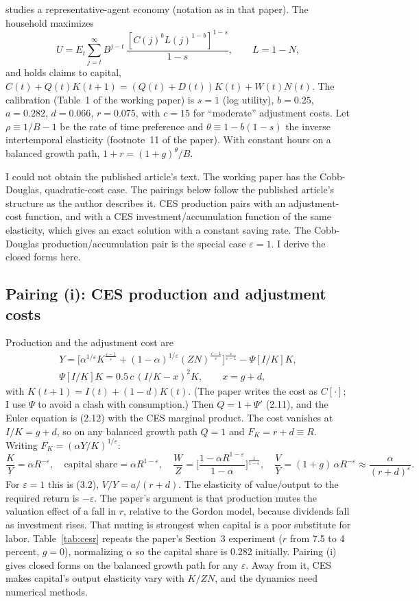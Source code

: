 \documentclass[11pt]{article}
\newcommand{\e}{\varepsilon}
\begin{document}
\citet{kiley2000} studies a representative-agent economy (notation as in that paper).
The household maximizes
\begin{equation*}
U = E_t\sum_{j=t}^{\infty} B^{j-t}\,\frac{[C(j)^b L(j)^{1-b}]^{1-s}}{1-s},
\qquad L = 1-N, \tag{2.1}
\end{equation*}
and holds claims to capital, $C(t)+Q(t)K(t+1)=(Q(t)+D(t))K(t)+W(t)N(t)$. The
calibration (Table~1 of the working paper) is $s=1$ (log utility), $b=0.25$, $a=0.282$,
$d=0.066$, $r=0.075$, with $c=15$ for ``moderate'' adjustment costs. Let $\rho\equiv 1/B-1$
be the rate of time preference and $\theta\equiv 1-b(1-s)$ the inverse intertemporal
elasticity (footnote~11 of the paper). With constant hours on a balanced growth path,
$1+r=(1+g)^\theta/B$.

I could not obtain the published article's text. The working paper has the
Cobb-Douglas, quadratic-cost case. The pairings below follow the published
article's structure as the author describes it. CES production pairs with an
adjustment-cost function, and with a CES investment/accumulation function of the same
elasticity, which gives an exact solution with a constant saving rate. The Cobb-Douglas
production/accumulation pair is the special case $\e=1$. I derive the closed forms here.

\subsection{Pairing (i): CES production and adjustment costs}

Production and the adjustment cost are
\begin{gather*}
Y=\Big[\alpha^{1/\e}K^{\frac{\e-1}{\e}}+(1-\alpha)^{1/\e}(ZN)^{\frac{\e-1}{\e}}\Big]^{\frac{\e}{\e-1}}
-\Psi[I/K]K, \tag{2.7$'$}\\
\Psi[I/K]K=0.5\,c\,(I/K-x)^2K,\qquad x=g+d,
\end{gather*}
with $K(t+1)=I(t)+(1-d)K(t)$. (The paper writes the cost as $C[\cdot]$; I use $\Psi$ to
avoid a clash with consumption.) Then $Q=1+\Psi'$ (2.11), and the Euler equation is
(2.12) with the CES marginal product. The cost vanishes at $I/K=g+d$, so on any balanced
growth path $Q=1$ and $F_K=r+d\equiv R$. Writing $F_K=(\alpha Y/K)^{1/\e}$:
\begin{equation}
\frac KY=\alpha R^{-\e},\quad \text{capital share}=\alpha R^{1-\e},\quad
\frac WZ=\Big[\frac{1-\alpha R^{1-\e}}{1-\alpha}\Big]^{\frac1{1-\e}},\quad
\frac VY=(1+g)\,\alpha R^{-\e}\approx\frac{\alpha}{(r+d)^{\e}} .
\label{eq:ces1}
\end{equation}
For $\e=1$ this is (3.2), $V/Y=a/(r+d)$. The elasticity of value/output to the
required return is $-\e$. The paper's argument is that production mutes the valuation effect of a
fall in $r$, relative to the Gordon model, because dividends fall as investment
rises. That muting is strongest when capital is a poor substitute for labor. Table~\ref{tab:cesr}
repeats the paper's Section~3 experiment ($r$ from 7.5 to 4 percent, $g=0$), normalizing
$\alpha$ so the capital share is 0.282 initially. Pairing (i) gives closed forms on the
balanced growth path for any $\e$. Away from it, CES makes capital's output elasticity
vary with $K/ZN$, and the dynamics need numerical methods.
\end{document}
